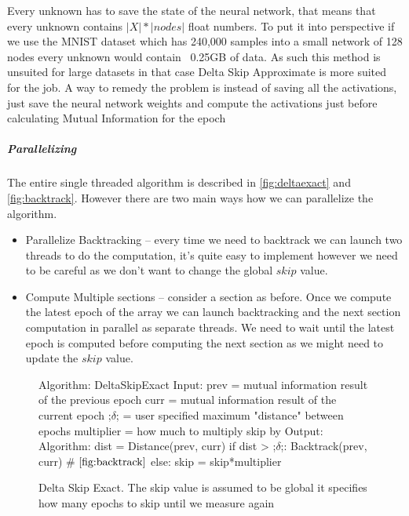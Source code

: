 \documentclass[dissertation.tex]{subfiles}
\begin{document}
  Every unknown has to save the state of the neural network, that means that
  every unknown contains $|X|*|nodes|$ float numbers. To put it into perspective
  if we use the MNIST dataset which has 240,000 samples into a small network of
  128 nodes every unknown would contain ~0.25GB of data. As such this method is
  unsuited for large datasets in that case Delta Skip Approximate is more suited
  for the job. A way to remedy the problem is instead of saving all the
  activations, just save the neural network weights and compute the activations
  just before calculating Mutual Information for the epoch
  
  \subparagraph{Parallelizing} 
  The entire single threaded algorithm is described in \autoref{fig:deltaexact}
  and \autoref{fig:backtrack}. However there are two main ways how we can
  parallelize the algorithm.
  \begin{itemize}
    \item{
        Parallelize Backtracking -- every time we need to backtrack we can
        launch two threads to do the computation, it's quite easy to implement
        however we need to be careful as we don't want to change the global
        $skip$ value.
      }
    \item{
        Compute Multiple sections -- consider a section as before.
        Once we compute the latest epoch of the array we can launch backtracking
        and the next section computation in parallel as separate threads.
        We need to wait until the latest epoch is computed before computing the
        next section as we might need to
        update the $skip$ value.
      }
  \end{itemize}

  

\begin{figure}[H]
    \begin{pythonfigure}
      Algorithm: DeltaSkipExact
      Input:
      prev = mutual information result of the previous epoch
      curr = mutual information result of the current epoch
      ;$\delta$; = user specified maximum "distance" between epochs
      multiplier = how much to multiply skip by
      Output:
      Algorithm:
      dist = Distance(prev, curr)
      if dist > ;$\delta$;:
        Backtrack(prev, curr) # $\autoref{fig:backtrack}$
      else:
        skip = skip*multiplier
    \end{pythonfigure}
    \caption{Delta Skip Exact. The skip value is assumed to be global it
    specifies how many epochs to skip until we measure again}
    \label{fig:deltaexact}
\end{figure}
\end{document}
